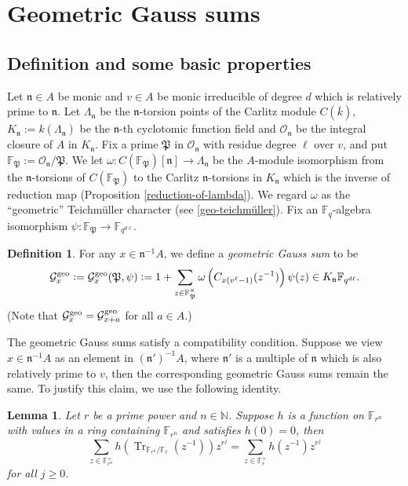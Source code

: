 \documentclass[11pt]{amsart}
\theoremstyle{plain}
\newtheorem{lem}[thm]{Lemma}
\theoremstyle{definition}
\newtheorem{defn}[thm]{Definition}
\theoremstyle{remark}
\numberwithin{equation}{section}
\newcommand{\NN}{\mathbb{N}}
\newcommand{\FF}{\mathbb{F}}
\newcommand{\nfk}{\mathfrak{n}}
\newcommand{\Pfk}{\mathfrak{P}}
\newcommand{\Gcal}{\mathcal{G}}
\newcommand{\Ocal}{\mathcal{O}}
\newcommand{\Tr}{\operatorname{Tr}}
\newcommand{\ovl}{\overline}
\newcommand{\Fq}{\FF_q}
\newcommand{\Fqdl}{\FF_{q^{d\l}}}
\newcommand{\bggs}{\Gcal^{\textnormal{geo}}}
\let\l\ell
\begin{document}
	\section{Geometric Gauss sums}     \label{section-geometric-gauss-sums}
	
	\subsection{Definition and some basic properties}     \label{section-definition-and-some-basic-properties}
	
	Let $\nfk \in A$ be monic and $v \in A$ be monic irreducible of degree $d$ which is relatively prime to $\nfk$.
	Let $\Lambda_\nfk$ be the $\nfk$-torsion points of the Carlitz module $C(\ovl{k})$, $K_\nfk := k(\Lambda_\nfk)$ be the $\nfk$-th cyclotomic function field and $\Ocal_\nfk$ be the integral closure of $A$ in $K_\nfk$.
	Fix a prime $\Pfk$ in $\Ocal_\nfk$ with residue degree $\l$ over $v$, and put $\FF_\Pfk := \Ocal_\nfk/\Pfk$.
	We let $\omega: C(\FF_{\Pfk})[\nfk] \to \Lambda_\nfk$ be the $A$-module isomorphism from the $\nfk$-torsions of $C(\FF_{\Pfk})$ to the Carlitz $\nfk$-torsions in $K_\nfk$ which is the inverse of reduction map (Proposition \ref{reduction-of-lambda}).
	We regard $\omega$ as the “geometric” Teichmüller character (see \eqref{geo-teichmüller}).
	Fix an $\Fq$-algebra isomorphism $\psi: \FF_\Pfk \to \Fqdl$.
	
	\begin{defn}    \label{ggs-definition}
		For any $x \in \nfk^{-1}A$, we define a \textit{geometric Gauss sum} to be
		$$
		\bggs_x
		:= \bggs_x (\Pfk,\psi)
		:= 1 + \sum_{z \in \FF_\Pfk^\times} \omega\left(C_{x(v^\l-1)}(z^{-1})\right)\psi(z) \in K_\nfk\Fqdl.
		$$
		(Note that $\bggs_{x} = \bggs_{x+a}$ for all $a \in A$.)
	\end{defn}
	
	The geometric Gauss sums satisfy a compatibility condition.
	Suppose we view $x \in \nfk^{-1}A$ as an element in $(\nfk')^{-1}A$, where $\nfk'$ is a multiple of $\nfk$ which is also relatively prime to $v$, then the corresponding geometric Gauss sums remain the same.
	To justify this claim, we use the following identity.
	
	\begin{lem}    \label{descending-ggs}
		Let $r$ be a prime power and $n\in\NN$.
		Suppose $h$ is a function on $\FF_{r^n}$ with values in a ring containing $\FF_{r^n}$ and satisfies $h(0) = 0$, then
		$$
		\sum_{z \in \FF_{r^n}^\times} h\left( \Tr_{\FF_{r^n}/\FF_r} (z^{-1}) \right) z^{r^j}
		=  \sum_{z \in \FF_r^\times} h(z^{-1}) z^{r^j}
		$$
		for all $j \geq 0$.
	\end{lem}
	
\end{document}
